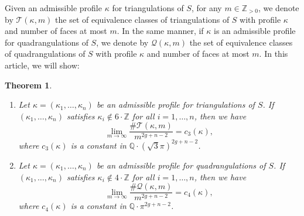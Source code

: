 \documentclass[JEP,XML,SOM,Unicode]{cedram}
\newenvironment{enumeratei}
{\bgroup\def\theenumi{\roman{enumi}}\def\theenumii{\arabic{enumii}}\begin{enumerate}}
{\end{enumerate}\egroup}
\theoremstyle{plain}
\newtheorem{Theorem}{Theorem}[section]
\theoremstyle{definition}
\newcommand\Z{\mathbb{Z}}
\newcommand{\Q}{\mathbb{Q}}
\newcommand{\QQ}{\mathscr{Q}}
\newcommand{\TT}{\mathscr{T}}
\begin{document}
Given an admissible profile $\kappa$ for triangulations of $S$, for any $m\in \Z_{>0}$, we denote by $\TT(\kappa,m)$ the set of equivalence classes of triangulations of $S$ with profile $\kappa$ and number of faces at most $m$. In the same manner, if $\kappa$ is an admissible profile for quadrangulations of $S$, we denote by $\QQ(\kappa,m)$ the set of equivalence classes of quadrangulations of $S$ with profile $\kappa$ and number of faces at most $m$.
In this article, we will show:

\skpt
\begin{Theorem}\label{th:asymp:count}
\begin{enumeratei}
\item\label{th:asymp:counti}
Let $\kappa=(\kappa_1,\dots,\kappa_n)$ be an admissible profile for triangulations of $S$. If $(\kappa_1,\dots,\kappa_n)$ satisfies $\kappa_i\not\in 6\cdot\Z$ for all $i=1,\dots,n$, then we have
\begin{equation}\label{eq:asymp:triang}
\lim_{m \to \infty} \frac{\#\TT(\kappa,m)}{m^{2g+n-2}}=c_3(\kappa),
\end{equation}
where $c_3(\kappa)$ is a constant in $\Q\cdot(\sqrt{3}\pi)^{2g+n-2}$.

\item\label{th:asymp:countii}
Let $\kappa=(\kappa_1,\dots,\kappa_n)$ be an admissible profile for quadrangulations of $S$. If $(\kappa_1,\dots,\kappa_n)$ satisfies $\kappa_i\not\in 4\cdot\Z$ for all $i=1,\dots,n$, then we have
\begin{equation}\label{eq:asymp:quad}
\lim_{m \to \infty} \frac{\#\QQ(\kappa,m)}{m^{2g+n-2}}=c_4(\kappa),
\end{equation}
where $c_4(\kappa)$ is a constant in $\Q\cdot\pi^{2g+n-2}$.
\end{enumeratei}
\end{Theorem}
\end{document}

